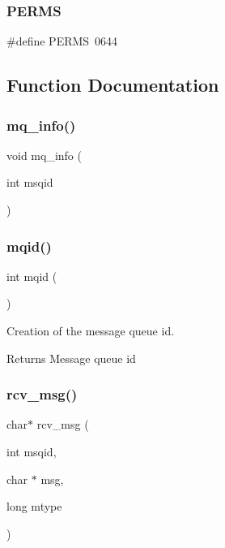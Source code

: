 \subsubsection{P\+E\+R\+MS}
{\footnotesize\ttfamily \#define P\+E\+R\+MS~0644}



\subsection{Function Documentation}
\mbox{\label{mq_8h_ad6373ac4d80e0c6198e95bb3a0515ff4}} 
\subsubsection{mq\+\_\+info()}
{\footnotesize\ttfamily void mq\+\_\+info (\begin{DoxyParamCaption}\item[{int}]{msqid }\end{DoxyParamCaption})}

\mbox{\label{mq_8h_aa6a2e92e60754c750bebd73bced350fd}} 
\subsubsection{mqid()}
{\footnotesize\ttfamily int mqid (\begin{DoxyParamCaption}{ }\end{DoxyParamCaption})}



Creation of the message queue id. 

\begin{DoxyReturn}{Returns}
Message queue id 
\end{DoxyReturn}
\mbox{\label{mq_8h_a07daba13b107a4b924dafaa1acf84235}} 
\subsubsection{rcv\+\_\+msg()}
{\footnotesize\ttfamily char$\ast$ rcv\+\_\+msg (\begin{DoxyParamCaption}\item[{int}]{msqid,  }\item[{char $\ast$}]{msg,  }\item[{long}]{mtype }\end{DoxyParamCaption})}



